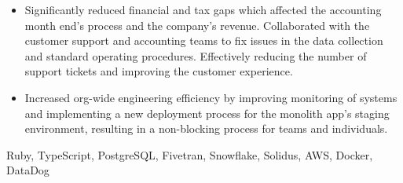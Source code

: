 \documentclass[paper=a4,fontsize=11pt]{scrartcl} %
\newcommand{\getenv}[2][]{%
  \CatchFileEdef{\temp}{"|kpsewhich --var-value #2"}{\endlinechar=-1}%
  \if\relax\detokenize{#1}\relax\temp\else\let#1\temp\fi}
\newcommand{\sepspace}{\vspace*{1em}}     %
\newcommand{\WorkEntry}[6]{%
  \noindent \textbf{#1} \hfill                      %
  \colorbox{Black}{%
    \parbox{9em}{%
    \hfill\color{White}#2}} \par                    %
  \noindent \textit{#3} \par                        %
  \getenv[\CV]{CV}
  \ifthenelse{\equal{#6}{collapseDetailsOnResume} \AND \not\equal{\CV}{true}}{}{%
    \noindent\hangindent=2em\hangafter=0 \small #4  %
    \normalsize \par
    \ifx&#5&\else %
      {\small
        \hspace{0.0em}\textbf{Tools:} #5 \par       %
      }
    \fi
  }
  \sepspace
}
\begin{document}
{\begin{itemize}
    \item Significantly reduced financial and tax gaps which affected the accounting month end's
          process and the company's revenue. Collaborated with the customer support and accounting
          teams to fix issues in the data collection and standard operating procedures. Effectively
          reducing the number of support tickets and improving the customer experience.
    \item Increased org-wide engineering efficiency by improving monitoring of systems
          and implementing a new deployment process for the monolith app's staging environment,
          resulting in a non-blocking process for teams and individuals.
  \end{itemize}
}
{Ruby, TypeScript, PostgreSQL, Fivetran, Snowflake, Solidus, AWS, Docker, DataDog}

\end{document}
